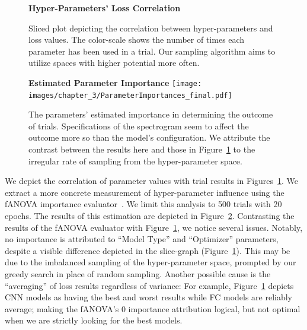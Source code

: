 \documentclass[\main/thesis.tex]{subfiles}
\begin{document}
\begin{figure}[]
\begin{center}
    \textbf{Hyper-Parameters' Loss Correlation}
      \caption{Sliced plot depicting the correlation between hyper-parameters and loss values. The color-scale shows the number of times each parameter has been used in a trial. Our sampling algorithm aims to utilize spaces with higher potential more often. }
    \label{fig:slicegraph}
    \end{center}

\end{figure}
   

\begin{figure}[]
\centering
\textbf{Estimated Parameter Importance}
\texttt{[image: images/chapter\_3/ParameterImportances\_final.pdf]}
\caption{The parameters' estimated importance in determining the outcome of trials. Specifications of the spectrogram seem to affect the outcome more so than the model's configuration. We attribute the contrast between the results here and those in Figure~\ref{fig:slicegraph} to the irregular rate of sampling from the hyper-parameter space.}
\label{chap3:param_importance}
\end{figure}

We depict the correlation of parameter values with trial results in Figures~\ref{fig:slicegraph}. We extract a more concrete measurement of hyper-parameter influence using the fANOVA importance evaluator~\cite{hutter2014efficient}. We limit this analysis to 500 trials with 20 epochs. The results of this estimation are depicted in Figure~\ref{chap3:param_importance}. Contrasting the results of the fANOVA evaluator with Figure~\ref{fig:slicegraph}, we notice several issues. Notably, no importance is attributed to \enquote{Model Type} and \enquote{Optimizer} parameters, despite a visible difference depicted in the slice-graph (Figure~\ref{fig:slicegraph}). This may be due to the imbalanced sampling of the hyper-parameter space, prompted by our greedy search in place of random sampling. Another possible cause is the \enquote{averaging} of loss results regardless of variance: For example, Figure~\ref{fig:slicegraph} depicts CNN models as having the best and worst results while FC models are reliably average; making the fANOVA's 0 importance attribution logical, but not optimal when we are strictly looking for the best models. 
\end{document}
